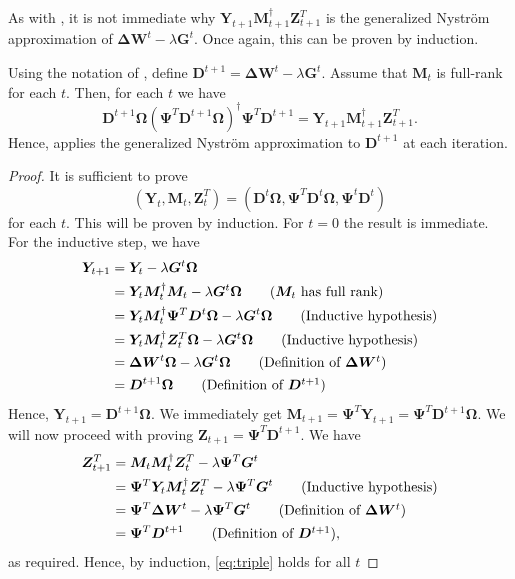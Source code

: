 \documentclass[11pt]{article}
\newcommand{\mat}[1]{\bm{#1}}
\newcommand{\DW}{\mat{\Delta W}}
\begin{document}
As with , it is not immediate why $\bm{Y}_{t+1} \bm{M}_{t+1}^{\dagger} \bm{Z}_{t+1}^T$ is the generalized Nyström approximation of $\DW^t - \lambda \bm{G}^t$. Once again, this can be proven by induction. 
\begin{lemma}
    Using the notation of , define $\bm{D}^{t+1} = \DW^t - \lambda \bm{G}^t$. Assume that $\bm{M}_t$ is full-rank for each $t$. Then, for each $t$ we have
    \begin{equation*}
        \bm{D}^{t+1}\bm{\Omega} (\bm{\Psi}^T \bm{D}^{t+1} \bm{\Omega})^{\dagger} \bm{\Psi}^T \bm{D}^{t+1} = \bm{Y}_{t+1} \bm{M}_{t+1}^{\dagger} \bm{Z}^{T}_{t+1}. 
    \end{equation*}
    Hence,  applies the generalized Nyström approximation to $\bm{D}^{t+1}$ at each iteration. 
\end{lemma}
\begin{proof}
   It is sufficient to prove
    \begin{equation}\label{eq:triple}
            (\bm{Y}_t, \bm{M}_t, \bm{Z}_t^T) = (\bm{D}^t \bm{\Omega}, \bm{\Psi}^T \bm{D}^{t} \bm{\Omega}, \bm{\Psi}^t \bm{D}^t)
    \end{equation}
    for each $t$. This will be proven by induction. For $t = 0$ the result is immediate. For the inductive step, we have
    \begin{align*}
    \bm{Y}_{t+1} &= \bm{Y}_t - \lambda \bm{G}^t \bm{\Omega}\\
    &= \bm{Y}_t\bm{M}_t^{\dagger}\bm{M}_t - \lambda \bm{G}^t \bm{\Omega} \tag{$\bm{M}_{t}$ has full rank} \\
    &=\bm{Y}_t \bm{M}_{t}^{\dagger} \bm{\Psi}^T \bm{D}^t \bm{\Omega} - \lambda \bm{G}^t \bm{\Omega} \tag{Inductive hypothesis}\\
    &=\bm{Y}_t \bm{M}_{t}^{\dagger} \bm{Z}_t^T \bm{\Omega} - \lambda \bm{G}^t \bm{\Omega} \tag{Inductive hypothesis}\\
    &= \DW^t \bm{\Omega} - \lambda \bm{G}^t \bm{\Omega} \tag{Definition of $\DW^t$}\\
    & = \bm{D}^{t+1}\bm{\Omega} \tag{Definition of $\bm{D}^{t+1}$}
\end{align*}
Hence, $\bm{Y}_{t+1} = \bm{D}^{t+1} \bm{\Omega}$. We immediately get $\bm{M}_{t+1} = \bm{\Psi}^T \bm{Y}_{t+1} = \bm{\Psi}^T \bm{D}^{t+1} \bm{\Omega}$. We will now proceed with proving $\bm{Z}_{t+1} = \bm{\Psi}^T \bm{D}^{t+1}$. We have
\begin{align*}
    \bm{Z}_{t+1}^T &= \bm{M}_t\bm{M}_t^{\dagger} \bm{Z}_t^T - \lambda \bm{\Psi}^T \bm{G}^t\\
    &=\bm{\Psi}^T\bm{Y}_t \bm{M}_{t}^{\dagger} \bm{Z}_{t}^T - \lambda \bm{\Psi}^T\bm{G}^t \tag{Inductive hypothesis}\\
    &=\bm{\Psi}^T \DW^t - \lambda \bm{\Psi}^T \bm{G}^t \tag{Definition of $\DW^t$}\\
    & = \bm{\Psi}^T\bm{D}^{t+1} \tag{Definition of $\bm{D}^{t+1}$},
\end{align*}
as required. Hence, by induction, \eqref{eq:triple} holds for all $t$
\end{proof}
\end{document}
